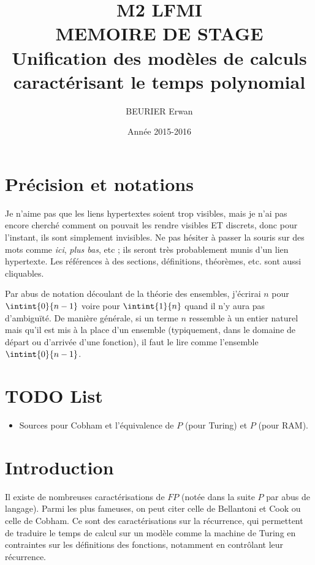\documentclass{report}
\author{BEURIER Erwan}
\title{M2 LFMI \\ MEMOIRE DE STAGE \\ Unification des modèles de calculs caractérisant le temps polynomial}
\date{Année 2015-2016}
\begin{document}
	
	\maketitle
	
	\pagebreak
	
	\section*{Précision et notations}
	\label{sec:Notations}
	
	Je n'aime pas que les liens hypertextes soient trop visibles, mais je n'ai pas encore cherché comment on pouvait les rendre visibles ET discrets, donc pour l'instant, ils sont simplement invisibles. Ne pas hésiter à passer la souris sur des mots comme \emph{ici}, \emph{plus bas}, etc ; ils seront très probablement munis d'un lien hypertexte. Les références à des sections, définitions, théorèmes, etc. sont aussi cliquables.
	
	Par abus de notation découlant de la théorie des ensembles, j'écrirai $n$ pour $\intint{0}{n-1}$ voire pour $\intint{1}{n}$ quand il n'y aura pas d'ambiguïté. De manière générale, si un terme $n$ ressemble à un entier naturel mais qu'il est mis à la place d'un ensemble (typiquement, dans le domaine de départ ou d'arrivée d'une fonction), il faut le lire comme l'ensemble $\intint{0}{n-1}$.
	
	\section*{TODO List}
	
	
	\begin{itemize}
		\item 	Sources pour Cobham et l'équivalence de $P$ (pour Turing) et $P$ (pour RAM).
	\end{itemize}
	
	\pagebreak
	
	
	
	\tableofcontents
	
	
	\pagebreak
	
	
	\section*{Introduction}
	
	Il existe de nombreuses caractérisations de $FP$ (notée dans la suite $P$ par abus de langage). Parmi les plus fameuses, on peut citer celle de Bellantoni et Cook \cite{BellantoniCook1992} ou celle de Cobham. Ce sont des caractérisations sur la récurrence, qui permettent de traduire le temps de calcul sur un modèle comme la machine de Turing en contraintes sur les définitions des fonctions, notamment en contrôlant leur récurrence. 
	
\end{document}
